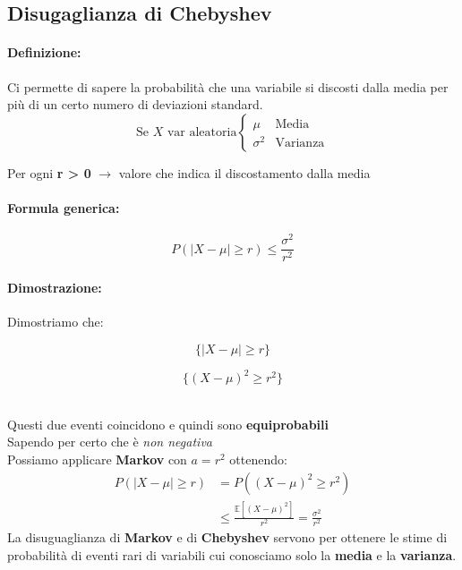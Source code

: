 \documentclass[]{article}
\newcommand{\ev}{\mathbb{E}[X]}
\renewcommand{\ev}[1]{\mathbb{E}[#1]}
\newcommand{\definizione}{\paragraph{Definizione:}}
\newcommand{\formula}{\paragraph{Formula generica:}}
\begin{document}
    \subsection{Disugaglianza di Chebyshev}
    \definizione Ci permette di sapere la probabilità che una variabile si discosti dalla media per più di un certo numero di deviazioni standard.
    \begin{equation*}
        \text{Se } X \text{ var aleatoria}
        \begin{cases}
            \mu & \text{Media} \\
            \sigma^2 & \text{Varianza}
        \end{cases}
    \end{equation*}

    \centerline{Per ogni \textbf{r > 0} $\longrightarrow$ valore che indica il discostamento dalla media}
    \formula 
    \[ P(|X - \mu| \geq r) \leq \frac{\sigma^2}{r^2} \]

    \paragraph{Dimostrazione:} Dimostriamo che: \\
    \begin{minipage}{0.45\linewidth}
        \[ \{ |X - \mu | \geq r \} \]
    \end{minipage}
    \begin{minipage}{0.45\linewidth}
        \[ \{ ( X - \mu )^2 \geq r^2 \} \]
    \end{minipage} \\
    \linebreak[4]
    Questi due eventi coincidono e quindi sono \textbf{equiprobabili} \\
    Sapendo per certo che  è \textit{non negativa} \\
    Possiamo applicare \textbf{Markov} con $a = r^2$ ottenendo:
    \begin{equation*}
        \begin{split}
            P(|X - \mu | \geq r) & = P((X - \mu)^2 \geq r^2) \\
            & \leq \frac{\ev{(X - \mu)^2}}{r^2} = \frac{\sigma^2}{r^2}
        \end{split}
    \end{equation*}
    \linebreak
    La disuguaglianza di \textbf{Markov} e di \textbf{Chebyshev} servono per ottenere le stime di probabilità di eventi rari di variabili
    cui conosciamo solo la \textbf{media} e la \textbf{varianza}.
\end{document}
